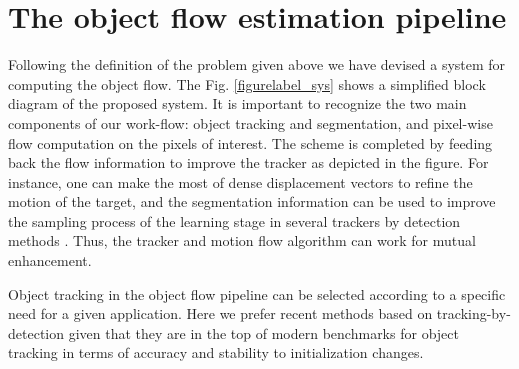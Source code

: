 \section{The object flow estimation pipeline}
\label{sec:desc}

Following the definition of the problem given above we have devised a system for computing the object flow.
The Fig. \ref{figurelabel_sys} shows a simplified block diagram of the proposed system. It is important to recognize the two main 
components of our work-flow: object tracking and segmentation, and pixel-wise flow computation on the pixels of interest.  The scheme is completed by feeding back the flow 
information to improve the tracker as depicted in the figure. For instance, one can make the most of dense displacement vectors to refine the motion of the target, and 
the segmentation information can be used to improve the sampling process of the learning stage in several trackers by detection methods \cite{c22}. Thus, 
the tracker and motion flow algorithm can work for mutual enhancement.


Object tracking in the object flow pipeline can be selected according to a specific need for a given application. Here we prefer recent methods based on tracking-by-detection given 
that they are in the top of modern benchmarks for object tracking \cite{c16} in terms of accuracy and stability to initialization changes.

